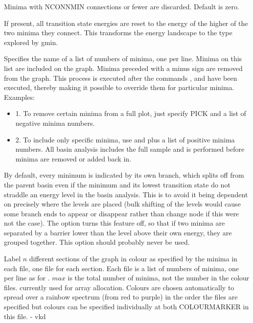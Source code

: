  Minima with NCONNMIN connections or fewer are discarded. Default is zero.

If present, all transition state energies are reset to the energy of the higher
of the two minima they connect. This transforms the energy landscape to the
type explored by gmin.

Specifies the name of a list of numbers of minima, one per line.  Minima on
this list are included on the graph.  Minima preceded with a minus sign are
removed from the graph.  This process is executed after the commands
,  and  have been executed, thereby making it
possible to override them for particular minima.  Examples: 
\begin{itemize}
\item 1. To remove certain minima from a full plot, just specify PICK 
and a list of negative minima numbers.
\item 2. To include only specific minima, use  and
 plus a list of positive minima numbers.  All basin analysis includes
the full sample and is performed before minima are removed or added back in.
\end{itemize}

By default, every minimum is indicated by its own branch, which splits off
from the parent basin even if the minimum and its lowest transition state do
not straddle an energy level in the basin analysis. This is to avoid it being
dependent on precisely where the levels are placed (bulk shifting of the levels
would cause some branch ends to appear or disappear rather than change node
if this were not the case). The  option turns this feature off, so that
if two minima are separated by a barrier lower than the level above their own
energy, they are grouped together. This option should probably never be used.

Label $n$ different sections of the graph in colour as specified by the 
minima in each file, one file for each section.  
Each file is a list of numbers of minima, 
one per line as for . $max$ is the total number of minima, not the number 
in the colour files. 
currently used for array allocation.
Colours are chosen automatically to spread over a rainbow spectrum  
(from red to purple) in the order the files are specified but colours can 
be specified individually at both COLOURMARKER in this file. - vkd 

